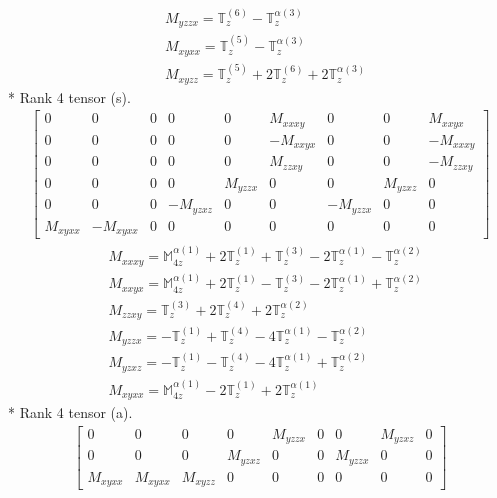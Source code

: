 \documentclass[fleqn,8pt,landscape]{jsarticle}
\begin{document}
\begin{align*}
& M_{yzzx} = \mathbb{T}_{z}^{(6)} - \mathbb{T}_{z}^{\alpha(3)} \\
& M_{xyxx} = \mathbb{T}_{z}^{(5)} - \mathbb{T}_{z}^{\alpha(3)} \\
& M_{xyzz} = \mathbb{T}_{z}^{(5)} + 2 \mathbb{T}_{z}^{(6)} + 2 \mathbb{T}_{z}^{\alpha(3)}
\end{align*}
* Rank 4 tensor (s).
\begin{align*}
\begin{bmatrix} 0 & 0 & 0 & 0 & 0 & M_{xxxy} & 0 & 0 & M_{xxyx} \\ 0 & 0 & 0 & 0 & 0 & - M_{xxyx} & 0 & 0 & - M_{xxxy} \\ 0 & 0 & 0 & 0 & 0 & M_{zzxy} & 0 & 0 & - M_{zzxy} \\ 0 & 0 & 0 & 0 & M_{yzzx} & 0 & 0 & M_{yzxz} & 0 \\ 0 & 0 & 0 & - M_{yzxz} & 0 & 0 & - M_{yzzx} & 0 & 0 \\ M_{xyxx} & - M_{xyxx} & 0 & 0 & 0 & 0 & 0 & 0 & 0 \end{bmatrix}
\end{align*}
\begin{align*}
& M_{xxxy} = \mathbb{M}_{4z}^{\alpha(1)} + 2 \mathbb{T}_{z}^{(1)} + \mathbb{T}_{z}^{(3)} - 2 \mathbb{T}_{z}^{\alpha(1)} - \mathbb{T}_{z}^{\alpha(2)} \\
& M_{xxyx} = \mathbb{M}_{4z}^{\alpha(1)} + 2 \mathbb{T}_{z}^{(1)} - \mathbb{T}_{z}^{(3)} - 2 \mathbb{T}_{z}^{\alpha(1)} + \mathbb{T}_{z}^{\alpha(2)} \\
& M_{zzxy} = \mathbb{T}_{z}^{(3)} + 2 \mathbb{T}_{z}^{(4)} + 2 \mathbb{T}_{z}^{\alpha(2)} \\
& M_{yzzx} = - \mathbb{T}_{z}^{(1)} + \mathbb{T}_{z}^{(4)} - 4 \mathbb{T}_{z}^{\alpha(1)} - \mathbb{T}_{z}^{\alpha(2)} \\
& M_{yzxz} = - \mathbb{T}_{z}^{(1)} - \mathbb{T}_{z}^{(4)} - 4 \mathbb{T}_{z}^{\alpha(1)} + \mathbb{T}_{z}^{\alpha(2)} \\
& M_{xyxx} = \mathbb{M}_{4z}^{\alpha(1)} - 2 \mathbb{T}_{z}^{(1)} + 2 \mathbb{T}_{z}^{\alpha(1)}
\end{align*}
* Rank 4 tensor (a).
\begin{align*}
\begin{bmatrix} 0 & 0 & 0 & 0 & M_{yzzx} & 0 & 0 & M_{yzxz} & 0 \\ 0 & 0 & 0 & M_{yzxz} & 0 & 0 & M_{yzzx} & 0 & 0 \\ M_{xyxx} & M_{xyxx} & M_{xyzz} & 0 & 0 & 0 & 0 & 0 & 0 \end{bmatrix}
\end{align*}
\end{document}
